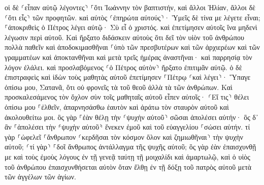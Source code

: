 \documentclass[twoside, 9pt]{extreport}
\begin{document}
οἱ δὲ ⸂εἶπαν αὐτῷ λέγοντες⸃ ⸀ὅτι Ἰωάννην τὸν βαπτιστήν, καὶ ἄλλοι Ἠλίαν, ἄλλοι δὲ ⸂ὅτι εἷς⸃ τῶν προφητῶν. 
καὶ αὐτὸς ⸂ἐπηρώτα αὐτούς⸃· Ὑμεῖς δὲ τίνα με λέγετε εἶναι; ⸀ἀποκριθεὶς ὁ Πέτρος λέγει αὐτῷ· Σὺ εἶ ὁ χριστός. 
καὶ ἐπετίμησεν αὐτοῖς ἵνα μηδενὶ λέγωσιν περὶ αὐτοῦ. 
Καὶ ἤρξατο διδάσκειν αὐτοὺς ὅτι δεῖ τὸν υἱὸν τοῦ ἀνθρώπου πολλὰ παθεῖν καὶ ἀποδοκιμασθῆναι ⸀ὑπὸ τῶν πρεσβυτέρων καὶ τῶν ἀρχιερέων καὶ τῶν γραμματέων καὶ ἀποκτανθῆναι καὶ μετὰ τρεῖς ἡμέρας ἀναστῆναι· 
καὶ παρρησίᾳ τὸν λόγον ἐλάλει. καὶ προσλαβόμενος ⸂ὁ Πέτρος αὐτὸν⸃ ἤρξατο ἐπιτιμᾶν αὐτῷ. 
ὁ δὲ ἐπιστραφεὶς καὶ ἰδὼν τοὺς μαθητὰς αὐτοῦ ἐπετίμησεν ⸀Πέτρῳ ⸂καὶ λέγει⸃· Ὕπαγε ὀπίσω μου, Σατανᾶ, ὅτι οὐ φρονεῖς τὰ τοῦ θεοῦ ἀλλὰ τὰ τῶν ἀνθρώπων. 
Καὶ προσκαλεσάμενος τὸν ὄχλον σὺν τοῖς μαθηταῖς αὐτοῦ εἶπεν αὐτοῖς· ⸂Εἴ τις⸃ θέλει ὀπίσω μου ⸀ἐλθεῖν, ἀπαρνησάσθω ἑαυτὸν καὶ ἀράτω τὸν σταυρὸν αὐτοῦ καὶ ἀκολουθείτω μοι. 
ὃς γὰρ ⸀ἐὰν θέλῃ τὴν ⸂ψυχὴν αὐτοῦ⸃ σῶσαι ἀπολέσει αὐτήν· ὃς δ᾽ ἂν ⸀ἀπολέσει τὴν ⸄ψυχὴν αὐτοῦ⸅ ἕνεκεν ἐμοῦ καὶ τοῦ εὐαγγελίου ⸀σώσει αὐτήν. 
τί γὰρ ⸀ὠφελεῖ ⸀ἄνθρωπον ⸂κερδῆσαι τὸν κόσμον ὅλον καὶ ζημιωθῆναι⸃ τὴν ψυχὴν αὐτοῦ; 
⸂τί γὰρ⸃ ⸀δοῖ ἄνθρωπος ἀντάλλαγμα τῆς ψυχῆς αὐτοῦ; 
ὃς γὰρ ἐὰν ἐπαισχυνθῇ με καὶ τοὺς ἐμοὺς λόγους ἐν τῇ γενεᾷ ταύτῃ τῇ μοιχαλίδι καὶ ἁμαρτωλῷ, καὶ ὁ υἱὸς τοῦ ἀνθρώπου ἐπαισχυνθήσεται αὐτὸν ὅταν ἔλθῃ ἐν τῇ δόξῃ τοῦ πατρὸς αὐτοῦ μετὰ τῶν ἀγγέλων τῶν ἁγίων. 
\end{document}
